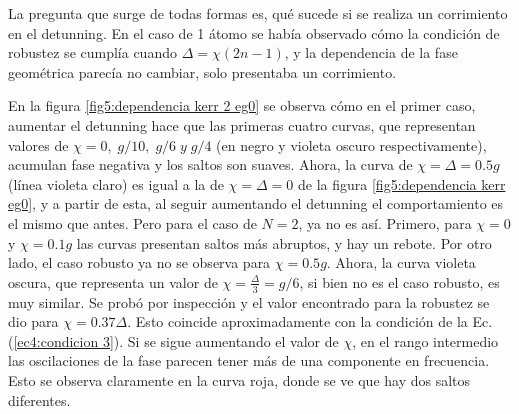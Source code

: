 La pregunta que surge de todas formas es, qué sucede si se realiza un corrimiento en el detunning. En el caso de 1 átomo se había observado cómo la condición de robustez se cumplía cuando $\Delta=\chi(2n-1)$, y la dependencia de la fase geométrica parecía no cambiar, solo presentaba un corrimiento. 

En la figura \ref{fig5:dependencia kerr 2 eg0} se observa cómo en el primer caso, aumentar el detunning hace que las primeras cuatro curvas, que representan valores de $\chi=0,\;g/10,\;g/6\; y\;g/4$ (en negro y violeta oscuro respectivamente), acumulan fase negativa y los saltos son suaves. Ahora, la curva de $\chi=\Delta=0.5g$ (línea violeta claro) es igual a la de $\chi=\Delta=0$ de la figura \ref{fig5:dependencia kerr eg0}, y a partir de esta, al seguir aumentando el detunning el comportamiento es el mismo que antes. Pero para el caso de $N=2$, ya no es así. Primero, para $\chi=0$ y $\chi=0.1g$ las curvas presentan saltos más abruptos, y hay un rebote. Por otro lado, el caso robusto ya no se observa para $\chi=0.5g$. Ahora, la curva violeta oscura, que representa un valor de $\chi=\frac{\Delta}{3}=g/6$, si bien no es el caso robusto, es muy similar. Se probó por inspección y el valor encontrado para la robustez se dio para $\chi=0.37\Delta$. Esto coincide aproximadamente con la condición de la Ec. (\ref{ec4:condicion 3}). Si se sigue aumentando el valor de $\chi$, en el rango intermedio las oscilaciones de la fase parecen tener más de una componente en frecuencia. Esto se observa claramente en la curva roja, donde se ve que hay dos saltos diferentes. 

